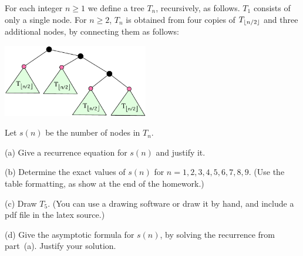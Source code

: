 \documentclass{article}
\begin{document}
\begin{problem}
For each integer $n \ge 1$ we define a tree $T_n$, recursively, as follows. $T_1$ consists of only
a single node. For $n \ge 2$, $T_n$ is obtained from four copies of $T_{{\left\lfloor n/2\right\rfloor}}$ and three 
additional nodes, by connecting them as follows:
%
\begin{center}
\includegraphics[width=2.5in]{treeforhw4.pdf}
\end{center}
%

\smallskip
\noindent
Let $s(n)$ be the number of nodes in $T_n$. 

\smallskip
\noindent
(a) Give a recurrence equation for $s(n)$ and justify it.

\smallskip
\noindent
(b) Determine the exact values of $s(n)$ for $n = 1,2,3,4,5,6,7,8,9$. (Use the table formatting, as show at the end of the homework.)

\smallskip
\noindent
(c) Draw $T_5$. (You can use a drawing software or draw it by hand, and include a pdf file in the latex source.)

\smallskip
\noindent
(d) Give the asymptotic formula for $s(n)$, by solving the recurrence from part~(a). Justify your solution.
\end{problem}

\end{document}
